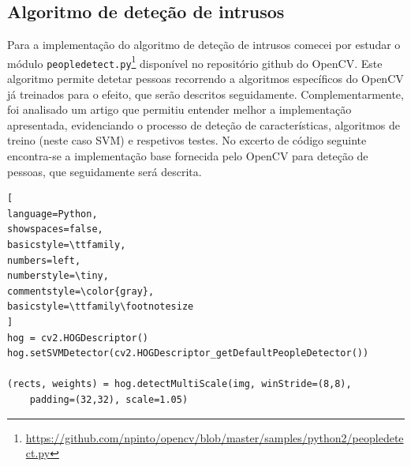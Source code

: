  


\subsection{Algoritmo de deteção de intrusos}
\label{algdetecao}


Para a implementação do algoritmo de deteção de intrusos comecei por estudar o módulo \texttt{peopledetect.py}\footnote{\url{https://github.com/npinto/opencv/blob/master/samples/python2/peopledetect.py}} disponível no repositório github do OpenCV. Este algoritmo permite detetar pessoas recorrendo a algoritmos específicos do OpenCV já treinados para o efeito, que serão descritos seguidamente. Complementarmente, foi analisado um artigo\cite{Dalal} que permitiu entender melhor a implementação apresentada, evidenciando o processo de deteção de características, algoritmos de treino (neste caso \ac{SVM}) e respetivos testes. No excerto de código seguinte encontra-se a implementação base fornecida pelo OpenCV para deteção de pessoas, que seguidamente será descrita. 

\begin{lstlisting}[
language=Python,
showspaces=false,
basicstyle=\ttfamily,
numbers=left,
numberstyle=\tiny,
commentstyle=\color{gray},
basicstyle=\ttfamily\footnotesize
]
hog = cv2.HOGDescriptor()
hog.setSVMDetector(cv2.HOGDescriptor_getDefaultPeopleDetector())

(rects, weights) = hog.detectMultiScale(img, winStride=(8,8), 
	padding=(32,32), scale=1.05)
\end{lstlisting}
	

